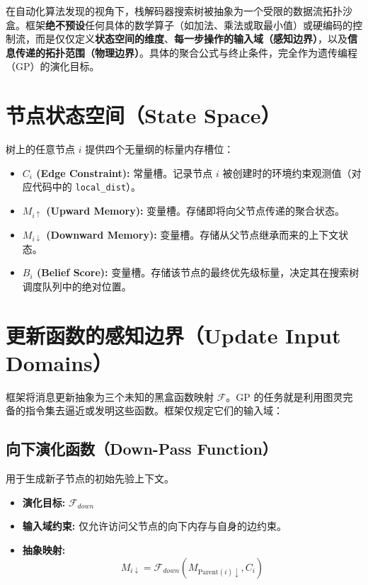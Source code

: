 在自动化算法发现的视角下，栈解码器搜索树被抽象为一个受限的数据流拓扑沙盒。框架\textbf{绝不预设}任何具体的数学算子（如加法、乘法或取最小值）或硬编码的控制流，而是仅仅定义\textbf{状态空间的维度}、\textbf{每一步操作的输入域（感知边界）}，以及\textbf{信息传递的拓扑范围（物理边界）}。具体的聚合公式与终止条件，完全作为遗传编程（GP）的演化目标。

\section{节点状态空间（State Space）}

树上的任意节点 $i$ 提供四个无量纲的标量内存槽位：

\begin{itemize}
    \item \textbf{$C_i$ (Edge Constraint):} 常量槽。记录节点 $i$ 被创建时的环境约束观测值（对应代码中的 \texttt{local\_dist}）。
    \item \textbf{$M_{i \uparrow}$ (Upward Memory):} 变量槽。存储即将向父节点传递的聚合状态。
    \item \textbf{$M_{i \downarrow}$ (Downward Memory):} 变量槽。存储从父节点继承而来的上下文状态。
    \item \textbf{$B_i$ (Belief Score):} 变量槽。存储该节点的最终优先级标量，决定其在搜索树调度队列中的绝对位置。
\end{itemize}

\section{更新函数的感知边界（Update Input Domains）}

框架将消息更新抽象为三个未知的黑盒函数映射 $\mathcal{F}$。GP 的任务就是利用图灵完备的指令集去逼近或发明这些函数。框架仅规定它们的输入域：

\subsection{向下演化函数（Down-Pass Function）}
用于生成新子节点的初始先验上下文。
\begin{itemize}
    \item \textbf{演化目标:} $\mathcal{F}_{down}$
    \item \textbf{输入域约束:} 仅允许访问父节点的向下内存与自身的边约束。
    \item \textbf{抽象映射:} 
    \[
    M_{i \downarrow} = \mathcal{F}_{down}\left( M_{\text{Parent}(i) \downarrow}, C_i \right)
    \]
\end{itemize}

